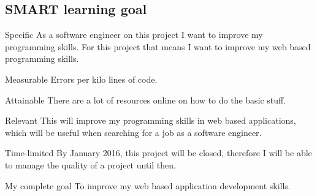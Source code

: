 \documentclass[12pt]{article}
\begin{document}
	\subsection{SMART learning goal}
	\begin{SMART}
	    \item[Specific] As a software engineer on this project I want to improve my programming skills. For this project that means I want to improve my web based programming skills.
	    \item[Measurable] Errors per kilo lines of code.
	    \item[Attainable] There are a lot of resources online on how to do the basic stuff.
	    \item[Relevant] This will improve my programming skills in web based applications, which will be useful when searching for a job as a software engineer.
	    \item[Time-limited]By January 2016, this project will be closed, therefore I will be able to manage the quality of a project until then.
	    \item[My complete goal] To improve my web based application development skills.
	\end{SMART}
	
\end{document}

